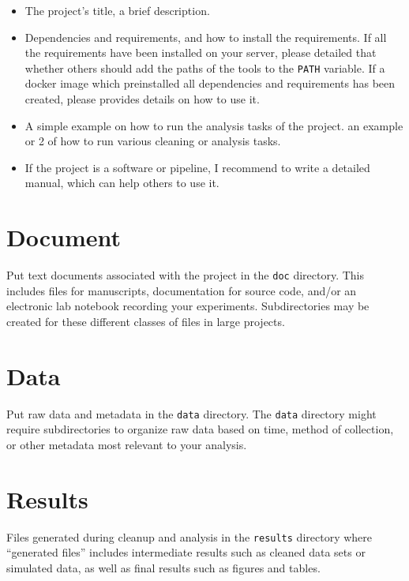 \documentclass[
]{book}
\providecommand{\tightlist}{%
  \setlength{\itemsep}{0pt}\setlength{\parskip}{0pt}}
\begin{document}
\begin{itemize}
\tightlist
\item
  The project's title, a brief description.
\item
  Dependencies and requirements, and how to install the requirements. If all the
  requirements have been installed on your server, please detailed that whether
  others should add the paths of the tools to the \texttt{PATH} variable. If a docker
  image which preinstalled all dependencies and requirements has been created,
  please provides details on how to use it.
\item
  A simple example on how to run the analysis tasks of the project.
  an example or 2 of how to run various cleaning or analysis tasks.
\item
  If the project is a software or pipeline, I recommend to write a detailed
  manual, which can help others to use it.
\end{itemize}

\hypertarget{document}{%
\section{Document}\label{document}}

Put text documents associated with the project in the \texttt{doc} directory. This
includes files for manuscripts, documentation for source code, and/or an
electronic lab notebook recording your experiments. Subdirectories may be
created for these different classes of files in large projects.

\hypertarget{data}{%
\section{Data}\label{data}}

Put raw data and metadata in the \texttt{data} directory. The \texttt{data} directory might
require subdirectories to organize raw data based on time, method of collection,
or other metadata most relevant to your analysis.

\hypertarget{results}{%
\section{Results}\label{results}}

Files generated during cleanup and analysis in the \texttt{results} directory where
``generated files'' includes intermediate results such as cleaned data sets or
simulated data, as well as final results such as figures and tables.
\end{document}
